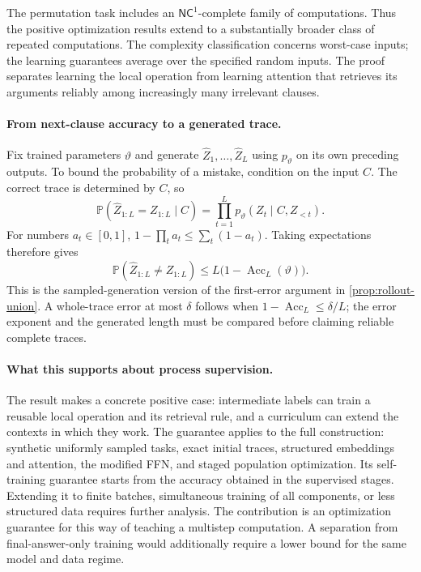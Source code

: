 \documentclass[11pt,twoside]{article}
\renewcommand{\P}{\mathbb P}
\theoremstyle{definition}
\theoremstyle{remark}
\begin{document}
The permutation task includes an $\mathsf{NC}^1$-complete family of
computations.
\label{en:state-tracking-complexity}
Thus the positive optimization results extend to a substantially broader
class of repeated computations. The complexity classification concerns
worst-case inputs; the learning guarantees average over the specified
random inputs. The proof separates learning the local
operation from learning attention that retrieves its arguments reliably
among increasingly many irrelevant clauses.

\paragraph{From next-clause accuracy to a generated trace.}
Fix trained parameters $\vartheta$ and generate $\widehat Z_1,\ldots,
\widehat Z_L$ using $p_\vartheta$ on its own preceding outputs. To bound
the probability of a mistake, condition on the input $C$. The correct
trace is determined by $C$, so
\[
\P(\widehat Z_{1:L}=Z_{1:L}\mid C)
=\prod_{t=1}^L p_\vartheta(Z_t\mid C,Z_{<t}).
\]
For numbers $a_t\in[0,1]$, $1-\prod_t a_t\le\sum_t(1-a_t)$.
Taking expectations therefore gives
\begin{equation}
\P(\widehat Z_{1:L}\ne Z_{1:L})
\le L\bigl(1-\operatorname{Acc}_L(\vartheta)\bigr).
\label{eq:state-tracking-rollout}
\end{equation}
This is the sampled-generation version of the first-error argument in
\cref{prop:rollout-union}. A whole-trace error at most $\delta$ follows
when $1-\operatorname{Acc}_L\le\delta/L$; the error exponent and the
generated length must be compared before claiming reliable complete traces.

\paragraph{What this supports about process supervision.}
The result makes a concrete positive case: intermediate labels can train
a reusable local operation and its retrieval rule, and a curriculum can
extend the contexts in which they work. The guarantee applies to the full
construction: synthetic uniformly sampled tasks, exact initial traces,
structured embeddings and attention, the modified FFN, and staged population
optimization. Its self-training guarantee starts from the accuracy obtained
in the supervised stages. Extending it to finite batches, simultaneous
training of all components, or less structured data requires further
analysis. The contribution is an optimization guarantee for this way of
teaching a multistep computation. A separation from final-answer-only
training would additionally require a lower bound for the same model and
data regime.
\end{document}

